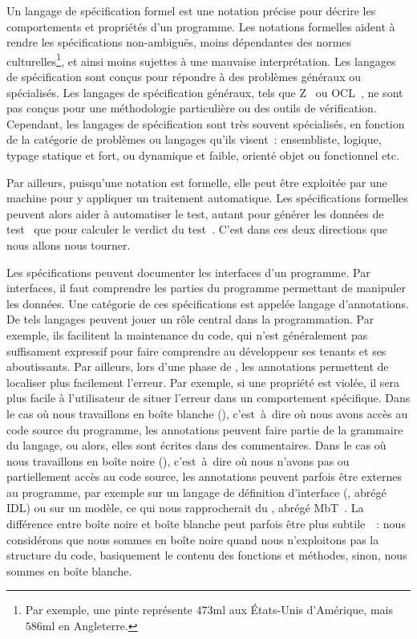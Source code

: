 Un {\strong langage de spécification} formel est une notation précise pour
décrire les comportements et propriétés d'un programme. Les {\strong notations
formelles} aident à rendre les spécifications non-ambiguës, moins dépendantes
des normes culturelles\footnote{Par exemple, une pinte représente $473$ml aux
États-Unis d'Amérique, mais $586$ml en Angleterre.}, et ainsi moins sujettes à
une mauvaise interprétation. Les langages de spécification sont conçus pour
répondre à des problèmes généraux ou spécialisés. Les langages de spécification
généraux, tels que Z~ ou OCL~, ne sont pas
conçus pour une méthodologie particulière ou des outils de vérification.
Cependant, les langages de spécification sont très souvent spécialisés, en
fonction de la catégorie de problèmes ou langages qu'ils visent~: ensembliste,
logique, typage statique et fort, ou dynamique et faible, orienté objet ou
fonctionnel etc.

Par ailleurs, puisqu'une notation est formelle, elle peut être exploitée par une
machine pour y appliquer un traitement automatique. Les spécifications formelles
peuvent alors aider à {\strong automatiser le test}, autant pour générer les
données de test~ que pour
calculer le verdict du test~. C'est dans ces deux directions que
nous allons nous tourner.

Les spécifications peuvent documenter les {\strong interfaces} d'un programme.
Par interfaces, il faut comprendre les parties du programme permettant de
manipuler les données. Une catégorie de ces spécifications est appelée {\strong
langage d'annotations}. De tels langages peuvent jouer un rôle central dans la
programmation. Par exemple, ils facilitent la maintenance du code, qui n'est
généralement pas suffisament expressif pour faire comprendre au développeur ses
tenants et ses aboutissants. Par ailleurs, lors d'une phase de
, les annotations permettent de localiser plus facilement
l'erreur. Par exemple, si une propriété est violée, il sera plus facile à
l'utilisateur de situer l'erreur dans un comportement spécifique. Dans le cas où
nous travaillons en {\strong boîte blanche} (),
c'est~à~dire où nous avons accès au code source du programme, les annotations
peuvent faire partie de la grammaire du langage, ou alors, elles sont écrites
dans des commentaires. Dans le cas où nous travaillons en {\strong boîte noire}
(), c'est~à~dire où nous n'avons pas ou partiellement accès
au code source, les annotations peuvent parfois être externes au programme, par
exemple sur un langage de définition d'interface (, abrégé IDL) ou sur un modèle, ce qui nous rapprocherait du
, abrégé MbT~. La différence
entre boîte noire et boîte blanche peut parfois être plus
subtile~~: nous considérons que nous sommes en boîte noire quand
nous n'exploitons pas la structure du code, basiquement le contenu des fonctions
et méthodes, sinon, nous sommes en boîte blanche.

